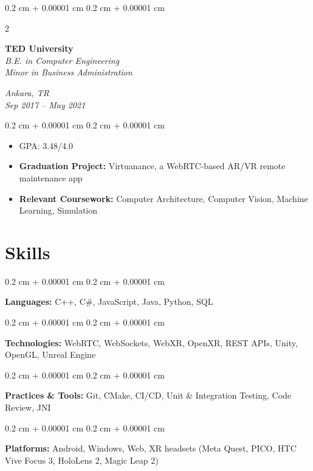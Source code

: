 \documentclass[10pt, a4paper]{article}
\newcommand{\sectionSpacing}{\vspace{0.45cm}}
\newcommand{\itemSpacing}{\vspace{0.25cm}}
\newcommand{\elementSpacing}{\vspace{0.20cm}}
\newenvironment{highlights}{
    \begin{itemize}[
        topsep=0.10 cm,
        parsep=0.10 cm,
        partopsep=0pt,
        itemsep=0pt,
        leftmargin=0.4 cm + 10pt
    ]
}{
    \end{itemize}
} %
\newenvironment{onecolentry}{
    \begin{adjustwidth}{
        0.2 cm + 0.00001 cm
    }{
        0.2 cm + 0.00001 cm
    }
}{
    \end{adjustwidth}
} %
\newenvironment{twocolentry}[2][]{
    \onecolentry
    \def\secondColumn{#2}
    \setcolumnwidth{\fill, 4.5 cm}
    \begin{paracol}{2}
}{
    \switchcolumn \raggedleft \secondColumn
    \end{paracol}
    \endonecolentry
} %
\begin{document}
        \begin{twocolentry}{
        \textit{Ankara, TR} \\
        \textit{Sep 2017 -- May 2021}}
        \textbf{TED University} \\
        \textit{B.E. in Computer Engineering} \\
        \textit{Minor in Business Administration}
        \end{twocolentry}

        \itemSpacing
        \begin{onecolentry}
            \begin{highlights}
                \item GPA: 3.48/4.0
                \item \textbf{Graduation Project:} Virtuanance, a WebRTC-based AR/VR remote maintenance app
                \item \textbf{Relevant Coursework:} Computer Architecture, Computer Vision, Machine Learning, Simulation
            \end{highlights}
        \end{onecolentry}
    \sectionSpacing

    \section{Skills}

        \begin{onecolentry}
            \textbf{Languages:} C++, C\#, JavaScript, Java, Python, SQL
        \end{onecolentry}

        \elementSpacing

        \begin{onecolentry}
            \textbf{Technologies:} WebRTC, WebSockets, WebXR, OpenXR, REST APIs, Unity, OpenGL, Unreal Engine
        \end{onecolentry}

        \elementSpacing

        \begin{onecolentry}
            \textbf{Practices \& Tools:} Git, CMake, CI/CD, Unit \& Integration Testing, Code Review, JNI
        \end{onecolentry}

        \elementSpacing

        \begin{onecolentry}
            \textbf{Platforms:} Android, Windows, Web, XR headsets (Meta Quest, PICO, HTC Vive Focus 3, HoloLens 2, Magic Leap 2)
        \end{onecolentry}
\end{document}
